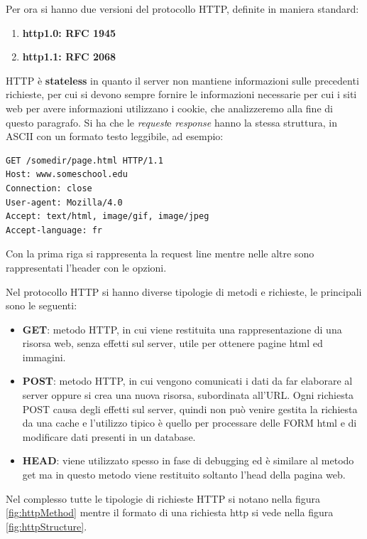 \documentclass[a4paper,12pt, oneside]{book}
\begin{document}
Per ora si hanno due versioni del protocollo HTTP, definite in maniera standard:
\begin{enumerate}
	\item\textbf{ http1.0: RFC 1945}
	\item\textbf{ http1.1: RFC 2068}
\end{enumerate}
HTTP è \textbf{stateless} in quanto il server non mantiene informazioni sulle precedenti richieste,
per cui si devono sempre fornire le informazioni necessarie per cui i siti web per avere informazioni 
utilizzano i cookie, che analizzeremo alla fine di questo paragrafo.\newline
Si ha che le \textit{request}e \textit{response} hanno la stessa struttura, in ASCII con un 
formato testo leggibile, ad esempio:
\begin{verbatim}
GET /somedir/page.html HTTP/1.1
Host: www.someschool.edu
Connection: close
User-agent: Mozilla/4.0
Accept: text/html, image/gif, image/jpeg
Accept-language: fr
\end{verbatim}
Con la prima riga si rappresenta la request line mentre nelle altre sono rappresentati l'header con le opzioni.

Nel protocollo HTTP si hanno diverse tipologie di metodi e richieste, le principali sono le seguenti:
\begin{itemize}
	\item \textbf{GET}: metodo HTTP, in cui viene restituita una rappresentazione di una risorsa web,
        senza effetti sul server, utile per ottenere pagine html ed immagini.

    \item \textbf{POST}: metodo HTTP, in cui vengono comunicati i dati da far elaborare al server oppure
        si crea una nuova risorsa, subordinata all'URL.\newline
        Ogni richiesta POST causa degli effetti sul server, quindi non può venire gestita la richiesta da 
        una cache e l'utilizzo tipico è quello per processare delle FORM html e di modificare 
        dati presenti in un database.
    
    \item \textbf{HEAD}: viene utilizzato spesso in fase di debugging ed è similare al metodo get
        ma in questo metodo viene restituito soltanto l'head della pagina web.
\end{itemize}
Nel complesso tutte le tipologie di richieste HTTP si notano nella figura \ref{fig:httpMethod} mentre 
il formato di una richiesta http si vede nella figura \ref{fig:httpStructure}.
\end{document}
